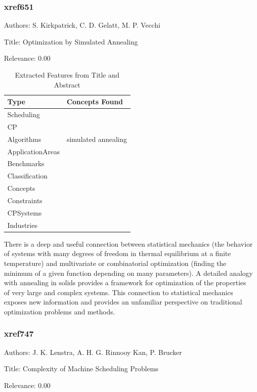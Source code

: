 \subsubsection{xref651}
\label{mw:xref651}

Authors: S. Kirkpatrick, C. D. Gelatt, M. P. Vecchi

Title: Optimization by Simulated Annealing

Relevance:  0.00

{\scriptsize
\begin{longtable}{p{2cm}p{20cm}}
\caption{Extracted Features from Title and Abstract}\\ \toprule
Type & Concepts Found\\ \midrule
\endhead
\bottomrule
\endfoot
Scheduling & \\ 
CP & \\ 
Algorithms & simulated annealing\\ 
ApplicationAreas & \\ 
Benchmarks & \\ 
Classification & \\ 
Concepts & \\ 
Constraints & \\ 
CPSystems & \\ 
Industries & \\ 
\end{longtable}
}

 There is a deep and useful connection between statistical mechanics (the behavior of systems with many degrees of freedom in thermal equilibrium at a finite temperature) and multivariate or combinatorial optimization (finding the minimum of a given function depending on many parameters). A detailed analogy with annealing in solids provides a framework for optimization of the properties of very large and complex systems. This connection to statistical mechanics exposes new information and provides an unfamiliar perspective on traditional optimization problems and methods. 

\subsubsection{xref747}
\label{mw:xref747}

Authors: J. K. Lenstra, A. H. G. Rinnooy Kan, P. Brucker

Title: Complexity of Machine Scheduling Problems

Relevance:  0.00

